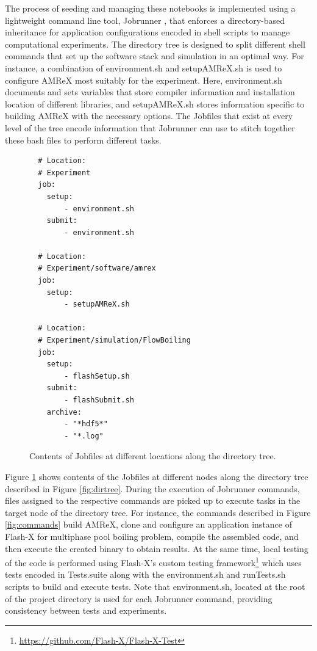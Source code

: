 \documentclass{IEEEcsmag}
\begin{document}
The process of seeding and managing these notebooks is implemented using a lightweight command line tool, Jobrunner \cite{Jobrunner}, that enforces a directory-based inheritance for application configurations encoded in shell scripts to manage computational experiments. The directory tree is designed to split different shell commands that set up the software stack and simulation in an optimal way. For instance, a combination of {environment.sh} and {setupAMReX.sh} is used to configure AMReX most suitably for the experiment. Here, {environment.sh} documents and sets variables that store compiler information and installation location of different libraries, and {setupAMReX.sh} stores information specific to building AMReX with the necessary options. The {Jobfiles} that exist at every level of the tree encode information that Jobrunner can use to stitch together these bash files to perform different tasks. 
%
\begin{figure}
\begin{verbatim}
  # Location:
  # Experiment
  job:
    setup:
        - environment.sh
    submit:
        - environment.sh

  # Location:
  # Experiment/software/amrex
  job:
    setup:
        - setupAMReX.sh

  # Location: 
  # Experiment/simulation/FlowBoiling
  job:
    setup:
        - flashSetup.sh
    submit:
        - flashSubmit.sh
    archive:
        - "*hdf5*"
        - "*.log"
\end{verbatim}
\caption{Contents of {Jobfiles} at different locations along the directory tree.}
\label{fig:jobfiles}
\end{figure}

Figure \ref{fig:jobfiles} shows contents of the {Jobfiles} at different nodes along the directory tree described in Figure \ref{fig:dirtree}. During the execution of Jobrunner commands, files assigned to the respective commands are picked up to execute tasks in the target node of the directory tree. For instance, the commands described in Figure \ref{fig:commands} build AMReX, clone and configure an application instance of Flash-X for multiphase pool boiling problem, compile the assembled code, and then execute the created binary to obtain results. At the same time, local testing of the code is performed using Flash-X's custom testing framework\footnote{\url{https://github.com/Flash-X/Flash-X-Test}} which uses tests encoded in {Tests.suite} along with the {environment.sh} and {runTests.sh} scripts to build and execute tests. Note that environment.sh, located at the root of the project directory is used for each Jobrunner command, providing consistency between tests and experiments. 
\end{document}
